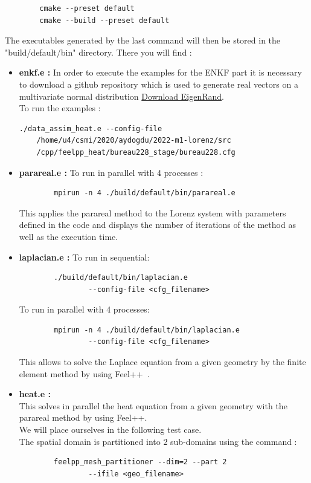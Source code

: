 \begin{enumerate}[label=\textbullet]
\begin{lstlisting}
		cmake --preset default
		cmake --build --preset default
\end{lstlisting}
		The executables generated by the last command will then be stored in the "build/default/bin" directory. There you will find :
		\begin{itemize}[label=-]
			\item \textbf{enkf.e : }In order to execute  the examples for the ENKF part it is necessary to download a github repository which is used to generate real vectors on a multivariate normal distribution \href{https://github.com/bab2min/EigenRand/releases/tag/v0.4.1}{Download EigenRand}. \\
			To run the examples :
\begin{lstlisting}
./data_assim_heat.e --config-file
    /home/u4/csmi/2020/aydogdu/2022-m1-lorenz/src
    /cpp/feelpp_heat/bureau228_stage/bureau228.cfg 
\end{lstlisting}
			\item \textbf{parareal.e : } To run in parallel with 4 processes :
\begin{lstlisting}
		mpirun -n 4 ./build/default/bin/parareal.e
\end{lstlisting}
			This applies the parareal method to the Lorenz system with parameters defined in the code and displays the number of iterations of the method as well as the execution time. 
			\item \textbf{laplacian.e : } To run in sequential:
\begin{lstlisting}
		./build/default/bin/laplacian.e 
				--config-file <cfg_filename>
\end{lstlisting}
			To run in parallel with 4 processes:
\begin{lstlisting}
		mpirun -n 4 ./build/default/bin/laplacian.e 
				--config-file <cfg_filename>
\end{lstlisting}
			This allows to solve the Laplace equation from a given geometry by the finite element method by using Feel++~\cite{feelpp_laplacian}.
			\item \textbf{heat.e : } \\
			This solves in parallel the heat equation from a given geometry with the parareal method by using Feel++. \\
			We will place ourselves in the following test case. \\
			The spatial domain is partitioned into 2 sub-domains using the command :
\begin{lstlisting}
		feelpp_mesh_partitioner --dim=2 --part 2 
				--ifile <geo_filename> 

\end{lstlisting}
\end{itemize}
\end{enumerate}

